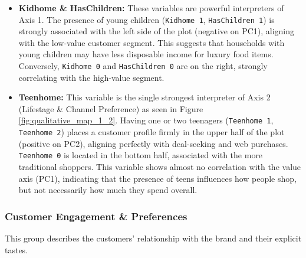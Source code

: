 \begin{itemize}
    \item \textbf{Kidhome \& HasChildren:} These variables are powerful interpreters of Axis 1. The presence of young children (\texttt{Kidhome 1}, \texttt{HasChildren 1}) is strongly associated with the left side of the plot (negative on PC1), aligning with the low-value customer segment. This suggests that households with young children may have less disposable income for luxury food items. Conversely, \texttt{Kidhome 0} and \texttt{HasChildren 0} are on the right, strongly correlating with the high-value segment.
    
    \item \textbf{Teenhome:} This variable is the single strongest interpreter of Axis 2 (Lifestage \& Channel Preference) as seen in Figure \ref{fig:qualitative_map_1_2}. Having one or two teenagers (\texttt{Teenhome 1}, \texttt{Teenhome 2}) places a customer profile firmly in the upper half of the plot (positive on PC2), aligning perfectly with deal-seeking and web purchases. \texttt{Teenhome 0} is located in the bottom half, associated with the more traditional shoppers. This variable shows almost no correlation with the value axis (PC1), indicating that the presence of teens influences how people shop, but not necessarily how much they spend overall.
\end{itemize}

\subsubsection{Customer Engagement \& Preferences}

This group describes the customers' relationship with the brand and their explicit tastes.

